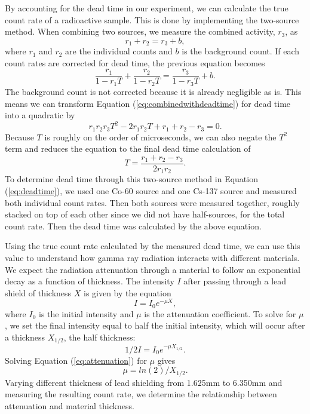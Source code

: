 \par By accounting for the dead time in our experiment, we can calculate the true count rate of a radioactive sample. This is done by implementing the two-source method. When combining two sources, we measure the combined activity, $r_3$, as 
\begin{equation}
r_1 + r_2 = r_3 + b,
\label{eq:combinedcountrate}
\end{equation} \cite{Spectrum}
where $r_1$ and $r_2$ are the individual counts and $b$ is the background count. If each count rates are corrected for dead time, the previous equation becomes
\begin{equation}
\frac{r_1}{1-r_1 T} + \frac{r_2}{1-r_2 T} = \frac{r_3}{1-r_3 T} + b.
\label{eq:combinedwithdeadtime}
\end{equation}
The background count is not corrected because it is already negligible as is. This means we can transform Equation (\ref{eq:combinedwithdeadtime}) for dead time into a quadratic by
\begin{equation}
r_1 r_2 r_3 T^2 - 2r_1 r_2 T + r_1 + r_2 - r_3 = 0.
\label{eq:quaddeadtime}
\end{equation}
Because $T$ is roughly on the order of microseconds, we can also negate the $T^2$ term and reduces the equation to the final dead time calculation of 
\begin{equation}
T = \frac{r_1 + r_2 - r_3}{2r_1 r_2}.
\label{eq:deadtime}
\end{equation}
To determine dead time through this two-source method in Equation (\ref{eq:deadtime}), we used one Co-60 source and one Cs-137 source and measured both individual count rates. Then both sources were measured together, roughly stacked on top of each other since we did not have half-sources, for the total count rate. Then the dead time was calculated by the above equation.

\par Using the true count rate calculated by the measured dead time, we can use this value to understand how gamma ray radiation interacts with different materials. We expect the radiation attenuation through a material to follow an exponential decay as a function of thickness. The intensity $I$ after passing through a lead shield of thickness $X$ is given by the equation
\begin{equation}
I = I_0e^{-\mu X},
\end{equation}\cite{Knoll}
where $I_0$ is the initial intensity and $\mu$ is the attenuation coefficient. To solve for $\mu$, we set the final intensity equal to half the initial intensity, which will occur after a thickness $X_{1/2}$, the half thickness:
\begin{equation}
1/2 I = I_0e^{-\mu X_{1/2}}.
\label{eq:attenuation}
\end{equation}
Solving Equation (\ref{eq:attenuation}) for $\mu$ gives
\begin{equation}
\mu = ln(2)/{X_{1/2}}.
\end{equation}
Varying different thickness of lead shielding from 1.625mm to 6.350mm and measuring the resulting count rate, we determine the relationship between attenuation and material thickness.

